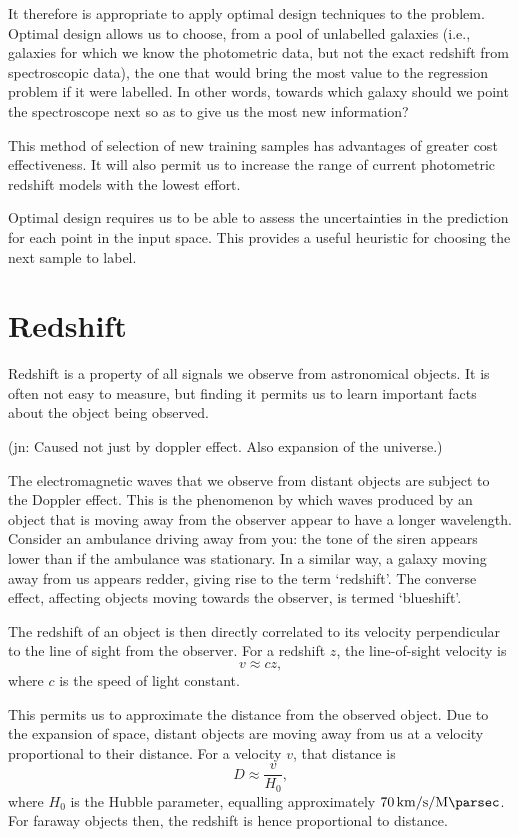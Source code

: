 \documentclass[11pt,twoside]{report}
\newcommand\jn[1]{{\color{red}(jn: #1)}}
\begin{document}
It therefore is appropriate to apply optimal design techniques to the problem. Optimal design allows us to choose, from a pool of unlabelled galaxies (i.e., galaxies for which we know the photometric data, but not the exact redshift from spectroscopic data), the one that would bring the most value to the regression problem if it were labelled. In other words, towards which galaxy should we point the spectroscope next so as to give us the most new information?

This method of selection of new training samples has advantages of greater cost effectiveness. It will also permit us to increase the range of current photometric redshift models with the lowest effort.

Optimal design requires us to be able to assess the uncertainties in the prediction for each point in the input space. This provides a useful heuristic for choosing the next sample to label.

\section{Redshift}
  Redshift is a property of all signals we observe from astronomical objects. It is often not easy to measure, but finding it permits us to learn important facts about the object being observed.

  \jn{Caused not just by doppler effect. Also expansion of the universe.}

  The electromagnetic waves that we observe from distant objects are subject to the Doppler effect. This is the phenomenon by which waves produced by an object that is moving away from the observer appear to have a longer wavelength. Consider an ambulance driving away from you: the tone of the siren appears lower than if the ambulance was stationary. In a similar way, a galaxy moving away from us appears redder, giving rise to the term `redshift'. The converse effect, affecting objects moving towards the observer, is termed `blueshift'.

  The redshift of an object is then directly correlated to its velocity perpendicular to the line of sight from the observer. For a redshift $z$, the line-of-sight velocity is\[
      v \approx cz \text{,}
  \] where $c$ is the speed of light constant.

  This permits us to approximate the distance from the observed object. Due to the expansion of space, distant objects are moving away from us at a velocity proportional to their distance. For a velocity $v$, that distance is \[
      D \approx \frac{v}{H_0} \text{,}
  \] where $H_0$ is the Hubble parameter, equalling approximately $\SI{70}{\kilo\meter\per\second\per\mega\parsec}$. For faraway objects then, the redshift is hence proportional to distance.
\end{document}
